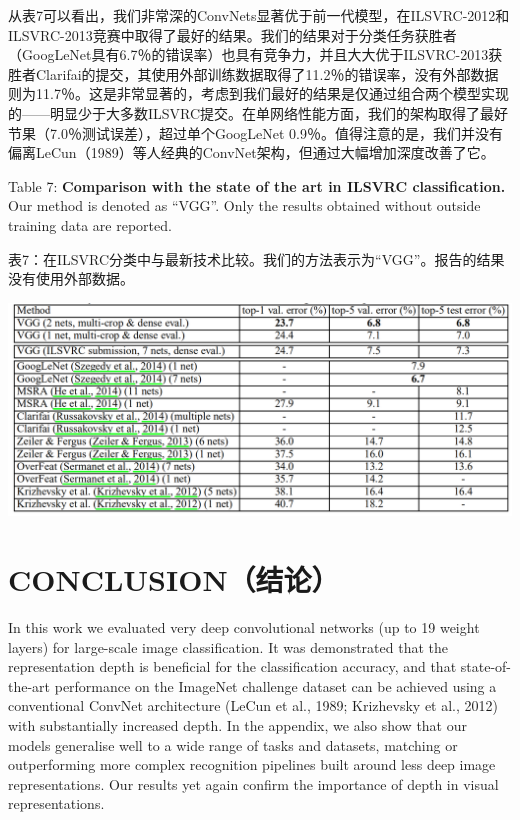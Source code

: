 \documentclass[12pt,a4paper,UTF8,twoside]{book}
\begin{document}
从表7可以看出，我们非常深的ConvNets显著优于前一代模型，在ILSVRC-2012和ILSVRC-2013竞赛中取得了最好的结果。我们的结果对于分类任务获胜者（GoogLeNet具有6.7％的错误率）也具有竞争力，并且大大优于ILSVRC-2013获胜者Clarifai的提交，其使用外部训练数据取得了11.2％的错误率，没有外部数据则为11.7％。这是非常显著的，考虑到我们最好的结果是仅通过组合两个模型实现的------明显少于大多数ILSVRC提交。在单网络性能方面，我们的架构取得了最好节果（7.0％测试误差），超过单个GoogLeNet 0.9％。值得注意的是，我们并没有偏离LeCun（1989）等人经典的ConvNet架构，但通过大幅增加深度改善了它。

Table 7: \textbf{Comparison with the state of the art in ILSVRC classification.} Our method is denoted as ``VGG''. Only the results obtained without outside training data are reported.

表7：在ILSVRC分类中与最新技术比较。我们的方法表示为``VGG''。报告的结果没有使用外部数据。

\begin{center}\includegraphics[width=0.7\linewidth]{img/03-07} \end{center}

\hypertarget{conclusionux7ed3ux8bba}{%
\section{CONCLUSION（结论）}\label{conclusionux7ed3ux8bba}}

In this work we evaluated very deep convolutional networks (up to 19 weight layers) for large-scale image classification. It was demonstrated that the representation depth is beneficial for the classification accuracy, and that state-of-the-art performance on the ImageNet challenge dataset can be achieved using a conventional ConvNet architecture (LeCun et al., 1989; Krizhevsky et al., 2012) with substantially increased depth. In the appendix, we also show that our models generalise well to a wide range of tasks and datasets, matching or outperforming more complex recognition pipelines built around less deep image representations. Our results yet again confirm the importance of depth in visual representations.
\end{document}
